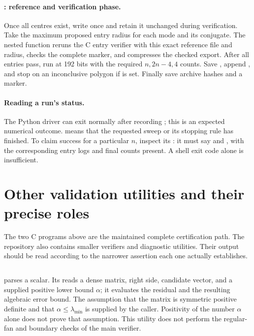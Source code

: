 \paragraph{: reference and verification phase.}
Once all centres exist, write  once and retain it unchanged
during verification. Take the maximum proposed entry radius for each mode
and its conjugate. The nested function  reruns the C entry
verifier with this exact reference file and radius, checks the complete
 marker, and compresses the checked export.
After all entries pass, run  at 192 bits with the required
$n,2n-4,4$ counts. Save , append ,
and stop on an inconclusive polygon if  is set.
Finally save archive hashes and a  marker.

\paragraph{Reading a run's status.}
The Python driver can exit normally after recording
; this is an expected numerical outcome.
 means that the requested sweep or its stopping rule has
finished. To claim success for a particular $n$, inspect its
: it must say  and
, with the corresponding entry logs and final
counts present. A shell exit code alone is insufficient.

\section{Other validation utilities and their precise roles}
The two C programs above are the maintained complete certification path.
The repository also contains smaller verifiers and diagnostic utilities.
Their output should be read according to the narrower assertion each
one actually establishes.

\subsection{}
 parses a scalar. Its  reads a dense matrix,
right side, candidate vector, and a supplied positive lower bound
$\alpha$; it evaluates the residual and the resulting algebraic error
bound. The assumption that the matrix is symmetric positive definite and
that $\alpha\leq\lambda_{\min}$ is supplied by the caller. Positivity of
the number $\alpha$ alone does not prove that assumption. This utility
does not perform the regular-fan and boundary checks of the main verifier.

